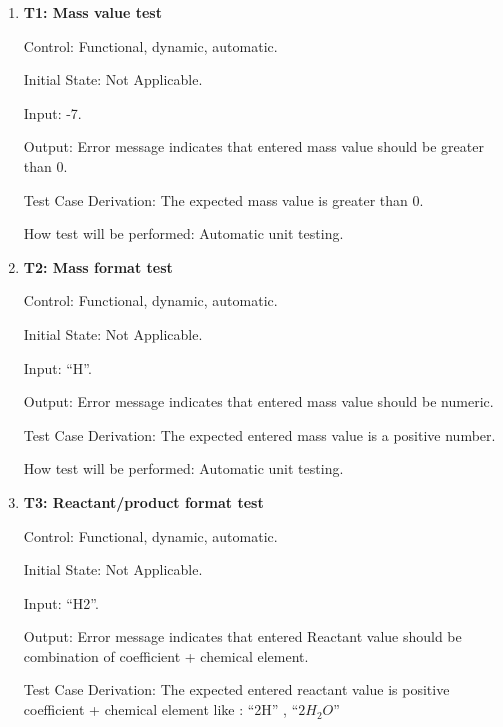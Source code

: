 \documentclass[12pt, titlepage]{article}
\begin{document}
\begin{enumerate}

\item{\bf T1: Mass value test\\}

Control: Functional, dynamic, automatic.
					
Initial State: Not Applicable.
					
Input: -7. 
					
Output: Error message indicates that entered mass value should be greater than
0.

Test Case Derivation: The expected mass value is greater than 0.
					
How test will be performed: Automatic unit testing.

\item{\bf T2: Mass format test\\}

Control: Functional, dynamic, automatic.
					
Initial State: Not Applicable.
					
Input: ``H''.
					
Output: Error message indicates that entered mass value should be numeric.

Test Case Derivation: The expected entered mass value is a positive number.
					
How test will be performed: Automatic unit testing.

\item{\bf T3: Reactant/product format test\\}

Control: Functional, dynamic, automatic.
					
Initial State: Not Applicable.
					
Input: ``H2''.
					
Output: Error message indicates that entered Reactant value should be
combination of coefficient + chemical element. 

Test Case Derivation: The expected entered reactant value is positive
coefficient + chemical element like : ``2H'' , ``$2H_2O$''
					

\end{enumerate}
\end{document}
